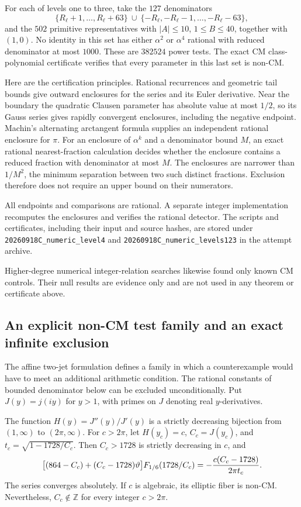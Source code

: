 For each of levels one to three, take the $127$ denominators
\[
 \{R_\ell+1,\ldots,R_\ell+63\}
 \ \cup\ \{-R_\ell,-R_\ell-1,\ldots,-R_\ell-63\},
\]
and the $502$ primitive representatives with $|A|\leq10$,
$1\leq B\leq40$, together with $(1,0)$.  No identity in this
set has either $\alpha^2$ or $\alpha^4$ rational with reduced
denominator at most $1000$.  These are $382524$ power tests.
The exact CM class-polynomial certificate verifies that every
parameter in this last set is non-CM.

Here are the certification principles. Rational recurrences and
geometric tail bounds give outward enclosures for the series and
its Euler derivative. Near the boundary the quadratic Clausen
parameter has absolute value at most $1/2$, so its Gauss series
gives rapidly convergent enclosures, including the negative
endpoint. Machin's alternating arctangent formula supplies an
independent rational enclosure for $\pi$. For an enclosure of
$\alpha^k$ and a denominator bound $M$, an exact rational
nearest-fraction calculation decides whether the enclosure
contains a reduced fraction with denominator at most $M$.
The enclosures are narrower than $1/M^2$, the minimum separation
between two such distinct fractions. Exclusion therefore does
not require an upper bound on their numerators.

All endpoints and comparisons are rational. A separate integer
implementation recomputes the enclosures and verifies the rational
detector. The scripts and certificates, including their input and
source hashes, are stored under
\texttt{20260918C\_numeric\_level4} and
\texttt{20260918C\_numeric\_levels123} in the attempt archive.

Higher-degree numerical integer-relation searches likewise found
only known CM controls. Their null results are evidence only and
are not used in any theorem or certificate above.

\subsection{An explicit non-CM test family and an exact infinite exclusion}
\label{subsec:C-explicit-jet}

The affine two-jet formulation defines a family in which a counterexample
would have to meet an additional arithmetic condition. The rational
constants of bounded denominator below can be excluded unconditionally.
Put $J(y)=j(iy)$ for $y>1$, with primes on $J$ denoting real $y$-derivatives.

\begin{proposition}\label{prop:C-jet-family}
The function $H(y)=J''(y)/J'(y)$ is a strictly decreasing bijection from
$(1,\infty)$ to $(2\pi,\infty)$. For $c>2\pi$, let $H(y_c)=c$,
$C_c=J(y_c)$, and $t_c=\sqrt{1-1728/C_c}$. Then $C_c>1728$ is strictly
decreasing in $c$, and
\begin{equation}\label{eq:C-jet-family-identity}
 \bigl[(864-C_c)+(C_c-1728)\vartheta\bigr]F_{1/6}(1728/C_c)
 =-\frac{c(C_c-1728)}{2\pi t_c}.
\end{equation}
The series converges absolutely. If $c$ is algebraic, its elliptic fiber is
non-CM. Nevertheless, $C_c\notin\mathbb Z$ for every integer $c>2\pi$.
\end{proposition}

